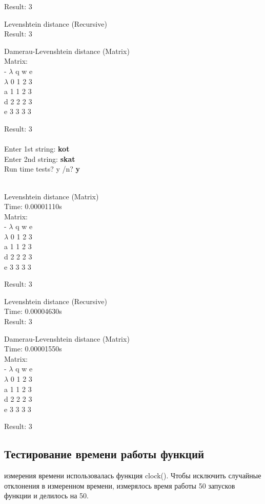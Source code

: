 \documentclass[a4paper,12pt]{article}
\begin{document}
    \noindent Result: 3


	\noindent Levenshtein distance (Recursive)\\
	Result: 3


	\noindent Damerau-Levenshtein distance (Matrix)\\
	Matrix:\\
    -   $\lambda$   q   w   e\\
    $\lambda$   0   1   2   3\\
    a   1   1   2   3\\
    d   2   2   2   3\\
    e   3   3   3   3

	\noindent Result: 3\\
	
	\smallskip
	\\
	\smallskip
	Enter 1st string: \textbf{kot}\\
	Enter 2nd string: \textbf{skat}\\
	Run time tests? y \slash n? \textbf{y}
	
	\\
	\smallskip
	\noindent Levenshtein distance (Matrix)\\
	Time: 0.00001110s\\
	Matrix:\\
    -   $\lambda$   q   w   e\\
    $\lambda$   0   1   2   3\\
    a   1   1   2   3\\
    d   2   2   2   3\\
    e   3   3   3   3

    \noindent Result: 3


	\noindent Levenshtein distance (Recursive)\\
	Time: 0.00004630s\\
	Result: 3


	\noindent Damerau-Levenshtein distance (Matrix)\\
	Time: 0.00001550s\\
	Matrix:\\
    -   $\lambda$   q   w   e\\
    $\lambda$   0   1   2   3\\
    a   1   1   2   3\\
    d   2   2   2   3\\
    e   3   3   3   3

	\noindent Result: 3
	\newpage
	\begin{center}
	    \subsection{Тестирование времени работы функций}	
	\end{center}
	     измерения времени использовалась функция clock(). Чтобы исключить случайные отклонения в измеренном времени, измерялось время работы 50 запусков функции и делилось на 50.
	    
\end{document}
